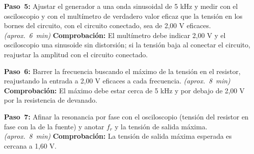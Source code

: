 \documentclass[12pt]{article}
\begin{document}
\begin{pasos}
  \item \textbf{Paso~5:} Ajustar el generador a una onda sinusoidal de 5 kHz y medir con el osciloscopio y con el multímetro de verdadero valor eficaz que la tensión en los bornes del circuito, con el circuito conectado, sea de 2,00 V eficaces. \emph{(aprox.~\SI{6}{\minute})} \textbf{Comprobación:} El multímetro debe indicar 2,00 V y el osciloscopio una sinusoide sin distorsión; si la tensión baja al conectar el circuito, reajustar la amplitud con el circuito conectado.
  \item \textbf{Paso~6:} Barrer la frecuencia buscando el máximo de la tensión en el resistor, reajustando la entrada a 2,00 V eficaces a cada frecuencia. \emph{(aprox.~\SI{8}{\minute})} \textbf{Comprobación:} El máximo debe estar cerca de 5 kHz y por debajo de 2,00 V por la resistencia de devanado.
  \item \textbf{Paso~7:} Afinar la resonancia por fase con el osciloscopio (tensión del resistor en fase con la de la fuente) y anotar $f_r$ y la tensión de salida máxima. \emph{(aprox.~\SI{8}{\minute})} \textbf{Comprobación:} La tensión de salida máxima esperada es cercana a 1,60 V.
\end{pasos}
\end{document}
